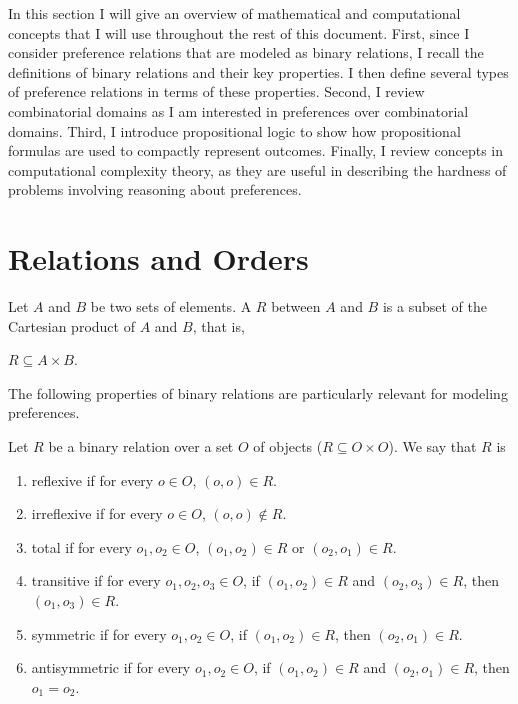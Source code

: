 
In this section I will give an overview of
mathematical and computational concepts
that I will use throughout the rest of this document. 
First, since I consider preference relations that are modeled
as binary relations,
I recall the definitions of binary relations and their key
properties.
I then define several types of preference relations in terms of
these properties.
Second, I review combinatorial domains as I am interested in
preferences over combinatorial domains.
Third, I introduce propositional logic to show how propositional
formulas are used to compactly represent outcomes.
Finally, I review concepts in computational complexity theory,
as they are useful in describing the hardness of problems
involving reasoning about preferences.

\section{Relations and Orders \label{sec:relations}}


\begin{definition}
	Let $A$ and $B$ be two sets of elements.  A  $R$ between $A$ and $B$
	is a subset of the Cartesian product of $A$ and $B$, that is,
	\begin{center}
		$R \subseteq A \times B$.
	\end{center}
\end{definition}


The following properties of binary relations are particularly relevant for modeling preferences.
\begin{definition}
	Let $R$ be a binary relation over a set $O$ of objects ($R \subseteq O \times O$).
	We say that $R$ is
	\begin{enumerate} \itemsep -4pt
		\item reflexive if for every $o \in O$, $(o,o) \in R$.
		\item irreflexive if for every $o \in O$, $(o,o) \not \in R$.
		\item total if for every $o_1,o_2 \in O$, $(o_1,o_2) \in R$ or $(o_2,o_1) \in R$.
		\item transitive if for every $o_1,o_2,o_3 \in O$, if $(o_1,o_2) \in R$ and $(o_2,o_3) \in R$, 
					then $(o_1,o_3) \in R$.
		\item symmetric if for every $o_1,o_2 \in O$, if $(o_1,o_2) \in R$, then $(o_2,o_1) \in R$.
		\item antisymmetric if for every $o_1,o_2 \in O$, if $(o_1,o_2) \in R$ and $(o_2,o_1) \in R$, then $o_1=o_2$.
	\end{enumerate}
\end{definition}

